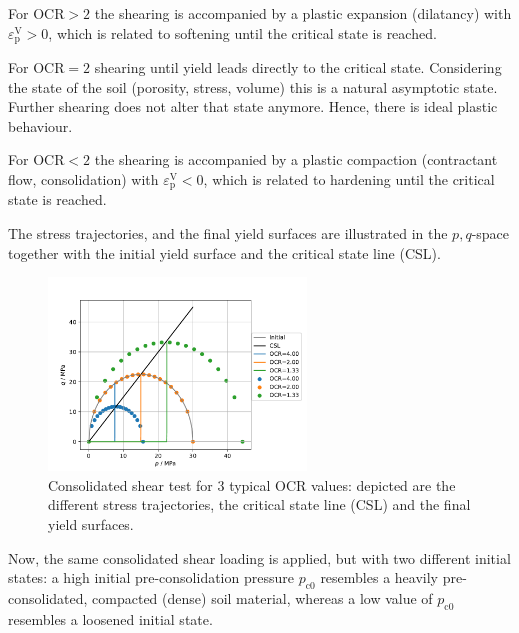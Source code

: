 \documentclass[paper=a4, twoside, pagesize]{scrartcl}
\renewcommand{\c}{\text{c}}
\newcommand{\p}{\text{p}}
\begin{document}
For $\text{OCR}>2$ the shearing is accompanied by a plastic expansion (dilatancy) with $\varepsilon_\p^\text{V}>0$, which is related to softening until the critical state is reached.
\par
For $\text{OCR}=2$ shearing until yield leads directly to the critical state. Considering the state of the soil (porosity, stress, volume) this is a natural asymptotic state. Further shearing does not alter that state anymore. Hence, there is ideal plastic behaviour.
\par
For $\text{OCR}<2$ the shearing is accompanied by a plastic compaction (contractant flow, consolidation) with $\varepsilon_\p^\text{V}<0$, which is related to hardening until the critical state is reached.
\par
\noindent
The stress trajectories, and the final yield surfaces are illustrated in the $p,q$-space together with the initial yield surface and the critical state line (CSL).
\begin{figure}[h!]\centering
  \vspace{-26mm}
  \includegraphics[width=0.61\textwidth]{img/SemiExplicitModifiedCamClay_OpenGeoSys2023/ModCamClay_ParamStudy_YieldSurface_pStudy}
  \caption{Consolidated shear test for 3 typical OCR values: depicted are the different stress trajectories, the critical state line (CSL) and the final yield surfaces.}\label{fig:mtestShear3casesYield}
\end{figure}
\par
\noindent
Now, the same consolidated shear loading is applied, but with two different initial states: a high initial pre-consolidation pressure $p_{\c0}$ resembles a heavily pre-consolidated, compacted (dense) soil material, whereas a low value of $p_{\c0}$ resembles a loosened initial state. 
\end{document}
